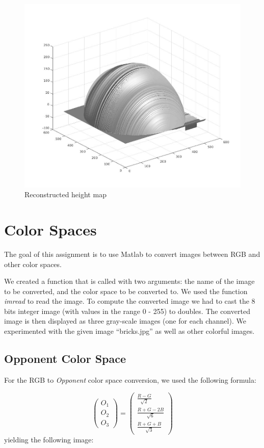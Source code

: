 \documentclass[11pt]{article}
\begin{document}
\begin{figure}[H]
    \centering
    \includegraphics[width=.8\textwidth]{height_map.jpg}
    \caption{Reconstructed height map}
    \label{fig:height_map}
\end{figure}


\section{Color Spaces}
The goal of this assignment is to use Matlab to convert images between RGB and other color spaces.

We created a function that is called with two arguments: the name of the image to be converted, and the color space to be converted to.
We used the function \textit{imread} to read the image.
To compute the converted image we had to cast the 8 bits integer image (with values in the range 0 - 255) to doubles.
The converted image is then displayed as three gray-scale images (one for each channel).
We experimented with the given image “bricks.jpg” as well as other colorful images.

\subsection{Opponent Color Space}
For the RGB to \textit{Opponent} color space conversion, we used the following formula:

$$
\begin{pmatrix}
	O_1 \\
	O_2 	\\
	O_3
\end{pmatrix} = 
\begin{pmatrix}
	\frac{R - G}{\sqrt{2}}			\\
	\frac{R + G - 2B}{\sqrt{6}}		\\
	\frac{R + G + B}{\sqrt{3}}
\end{pmatrix}
$$
yielding the following image:
\end{document}
